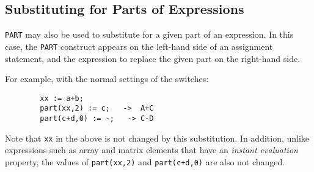 \subsection{Substituting for Parts of Expressions}

\texttt{PART} may also be used to substitute for a given part of an
expression.  In this case, the \texttt{PART} construct appears on the
left-hand side of an assignment statement, and the expression to replace
the given part on the right-hand side.

For example, with the normal settings of the {\REDUCE} switches:
\begin{verbatim}
        xx := a+b;
        part(xx,2) := c;   ->  A+C
        part(c+d,0) := -;   -> C-D
\end{verbatim}

Note that \texttt{xx} in the above is not changed by this substitution.  In
addition, unlike expressions such as array and matrix elements that have
an {\em instant evaluation\/} property, the values
of \texttt{part(xx,2)} and \texttt{part(c+d,0)} are also not changed.
